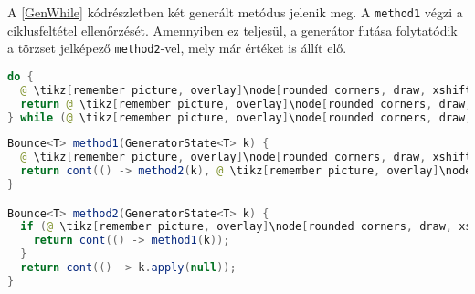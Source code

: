 A \ref{GenWhile} kódrészletben két generált metódus jelenik meg. A \texttt{method1} végzi a ciklusfeltétel ellenőrzését. Amennyiben ez teljesül, a generátor futása folytatódik a törzset jelképező \texttt{method2}-vel, mely már értéket is állít elő.   
\begin{center}
\begin{mdframed}[topline=true]
\begin{minipage}[t]{0.4\textwidth}
\begin{lstlisting}[language=Java, numbers=none, breaklines=true, aboveskip=1em]
do {
  @ \tikz[remember picture, overlay]\node[rounded corners, draw, xshift=-0.1cm, inner sep=5pt, anchor=west] {Kódrészlet}; \vspace*{0.5cm} @ 
  return @ \tikz[remember picture, overlay]\node[rounded corners, draw, xshift=-0.1cm, inner sep=5pt, anchor=west, yshift=0.1cm] {Kifejezés}; \vspace*{0.3cm} @
} while (@ \tikz[remember picture, overlay]\node[rounded corners, draw, xshift=-0.1cm, inner sep=5pt, anchor=west, yshift=0.1cm] {Feltétel}; \vspace*{0.3cm} \hspace*{1.14cm}@);
\end{lstlisting}
\end{minipage} 
\begin{minipage}[t]{0.6\textwidth}
\begin{lstlisting}[language=Java, numbers=none, breaklines=true]
Bounce<T> method1(GeneratorState<T> k) {
  @ \tikz[remember picture, overlay]\node[rounded corners, draw, xshift=-0.1cm, inner sep=5pt, anchor=west] {Kódrészlet}; \vspace*{0.3cm} @
  return cont(() -> method2(k), @ \tikz[remember picture, overlay]\node[rounded corners, draw, xshift=-0.1cm, inner sep=5pt, anchor=west, yshift=0.1cm] {Kifejezés}; \vspace*{0.2cm} \hspace*{1.2cm} @);
}

Bounce<T> method2(GeneratorState<T> k) {
  if (@ \tikz[remember picture, overlay]\node[rounded corners, draw, xshift=-0.1cm, inner sep=5pt, anchor=west, yshift=0.1cm] {Feltétel}; \hspace*{1.04cm} @) {
    return cont(() -> method1(k));
  }
  return cont(() -> k.apply(null));
}
\end{lstlisting} 
\end{minipage}
\end{mdframed}
\end{center}

